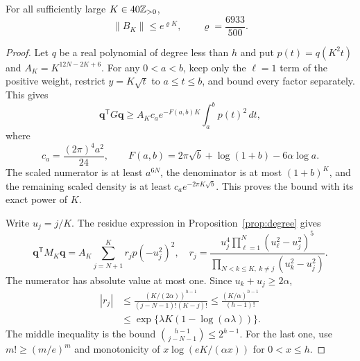 \begin{proposition}
\label{prop:relativenorm}
For all sufficiently large $K\in40\mathbb Z_{>0}$,
\begin{equation}\label{eq:relativenorm}
 \|B_K\|\le e^{\varrho K},\qquad\varrho=\frac{6933}{500}.
\end{equation}
\end{proposition}
\begin{proof}
Let $q$ be a real polynomial of degree less than $h$ and put
$p(t)=q(K^2t)$ and $A_K=K^{12N-2K+6}$. For any $0<a<b$, keep only the
$\ell=1$ term of the positive weight, restrict $y=K\sqrt t$ to
$a\le t\le b$, and bound every factor separately. This gives
\begin{equation}\label{eq:Glower}
 \boldsymbol q^{\mathsf T}G\boldsymbol q
 \ge A_Kc_a e^{-F(a,b)K}\int_a^b p(t)^2\,dt,
\end{equation}
where
\[
 c_a=\frac{(2\pi)^4a^2}{24},\qquad
 F(a,b)=2\pi\sqrt b+\log(1+b)-6\alpha\log a.
\]
The scaled numerator is at least $a^{6N}$, the denominator is at most
$(1+b)^K$, and the remaining scaled density is at least
$c_a e^{-2\pi K\sqrt b}$. This proves the bound with its exact power
of $K$.

Write $u_j=j/K$. The residue expression in
Proposition~\ref{prop:degree} gives
\begin{equation}\label{eq:Mresidue}
 \boldsymbol q^{\mathsf T}M_K\boldsymbol q
 =A_K\sum_{j=N+1}^K r_jp(-u_j^2)^2,
 \quad
 r_j=\frac{u_j^4\prod_{\ell=1}^N(u_\ell^2-u_j^2)^5}
               {\prod_{N<k\le K,\ k\ne j}(u_k^2-u_j^2)}.
\end{equation}
The numerator has absolute value at most one. Since $u_k+u_j\ge2\alpha$,
\begin{align*}
 |r_j|&\le
 \frac{(K/(2\alpha))^{h-1}}{(j-N-1)!(K-j)!}
 \le\frac{(K/\alpha)^{h-1}}{(h-1)!}\\
 &\le\exp\{\lambda K(1-\log(\alpha\lambda))\}.
\end{align*}
The middle inequality is the bound $\binom{h-1}{j-N-1}\le2^{h-1}$.
For the last one, use $m!\ge(m/e)^m$ and monotonicity of
$x\log(eK/(\alpha x))$ for $0<x\le h$.


\end{proof}
